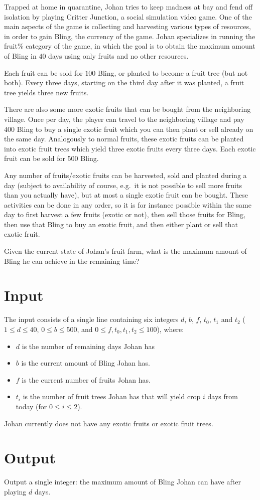 
%
\noindent
Trapped at home in quarantine, Johan tries to keep madness at bay and
fend off isolation by playing Critter Junction, a social simulation
video game.  One of the main aspects of the game is collecting and
harvesting various types of resources, in order to gain Bling, the
currency of the game.  Johan specializes in running the fruit\%
category of the game, in which the goal is to obtain the maximum
amount of Bling in $40$ days using only fruits and no other resources.

Each fruit can be sold for $100$ Bling, or planted to become a fruit
tree (but not both).  Every three days, starting on the third day
after it was planted, a fruit tree yields three new fruits.

There are also some more exotic fruits that can be bought from the
neighboring village.  Once per day, the player can travel to the
neighboring village and pay $400$ Bling to buy a single exotic fruit
which you can then plant or sell already on the same day.  Analogously
to normal fruits, these exotic fruits can be planted into exotic fruit
trees which yield three exotic fruits every three days.  Each exotic
fruit can be sold for $500$ Bling.

Any number of fruits/exotic fruits can be harvested, sold and planted
during a day (subject to availability of course, e.g.~it is not
possible to sell more fruits than you actually have), but at most a
single exotic fruit can be bought.  These activities can be done in
any order, so it is for instance possible within the same day to first
harvest a few fruits (exotic or not), then sell those fruits for Bling, then use that Bling to
buy an exotic fruit, and then either plant or sell that exotic fruit.

Given the current state of Johan's fruit farm, what is the maximum
amount of Bling he can achieve in the remaining time?

\section*{Input}

The input consists of a single line containing six integers $d$, $b$,
$f$, $t_0$, $t_1$ and $t_2$ ($1 \le d \le 40$, $0 \le b \le 500$, and $0 \le f, t_0, t_1,
t_2 \le 100$), where:
\begin{itemize}
\item $d$ is the number of remaining days Johan has
\item $b$ is the current amount of Bling Johan has.
\item $f$ is the current number of fruits Johan has.
\item $t_i$ is the number of fruit trees Johan has that will yield crop $i$ days from today (for $0 \le i \le 2$).
\end{itemize}

Johan currently does not have any exotic fruits or exotic fruit trees.

\section*{Output}

Output a single integer: the maximum amount of Bling Johan can have
after playing $d$ days.
